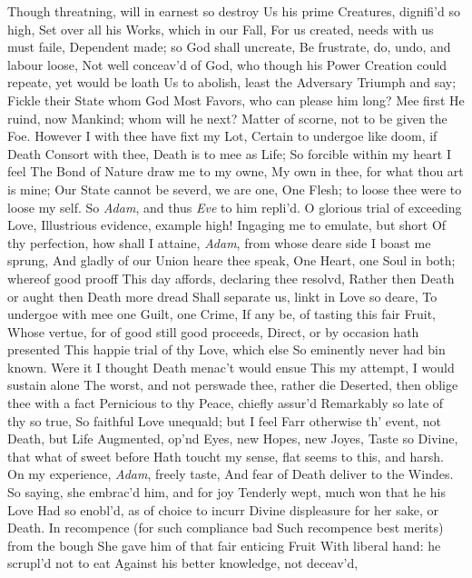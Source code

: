 \documentclass[11pt]{book}
\newcounter {first}
\begin{document}
Though threatning, will in earnest so destroy 
Us his prime Creatures, dignifi'd so high, 
Set over all his Works, which in our Fall, 
For us created, needs with us must faile, 
Dependent made; so God shall uncreate, 
Be frustrate, do, undo, and labour loose, 
Not well conceav'd of God, who though his Power 
Creation could repeate, yet would be loath 
Us to abolish, least the Adversary 
Triumph and say; Fickle their State whom God 
Most Favors, who can please him long?  Mee first 
He ruind, now Mankind; whom will he next? 
Matter of scorne, not to be given the Foe. 
However I with thee have fixt my Lot, 
Certain to undergoe like doom, if Death 
Consort with thee, Death is to mee as Life; 
So forcible within my heart I feel 
The Bond of Nature draw me to my owne, 
My own in thee, for what thou art is mine; 
Our State cannot be severd, we are one, 
One Flesh; to loose thee were to loose my self. 
\quad So \textit{Adam}, and thus \textit{Eve} to him repli'd. 
O glorious trial of exceeding Love, 
Illustrious evidence, example high! 
Ingaging me to emulate, but short 
Of thy perfection, how shall I attaine, 
\textit{Adam}, from whose deare side I boast me sprung, 
And gladly of our Union heare thee speak, 
One Heart, one Soul in both; whereof good prooff 
This day affords, declaring thee resolvd, 
Rather then Death or aught then Death more dread 
Shall separate us, linkt in Love so deare, 
To undergoe with mee one Guilt, one Crime, 
If any be, of tasting this fair Fruit, 
Whose vertue, for of good still good proceeds, 
Direct, or by occasion hath presented 
This happie trial of thy Love, which else 
So eminently never had bin known. 
Were it I thought Death menac't would ensue 
This my attempt, I would sustain alone 
The worst, and not perswade thee, rather die 
Deserted, then oblige thee with a fact 
Pernicious to thy Peace, chiefly assur'd 
Remarkably so late of thy so true, 
So faithful Love unequald; but I feel 
Farr otherwise th' event, not Death, but Life 
Augmented, op'nd Eyes, new Hopes, new Joyes, 
Taste so Divine, that what of sweet before 
Hath toucht my sense, flat seems to this, and harsh. 
On my experience, \textit{Adam}, freely taste, 
And fear of Death deliver to the Windes. 
\quad So saying, she embrac'd him, and for joy 
Tenderly wept, much won that he his Love 
Had so enobl'd, as of choice to incurr 
Divine displeasure for her sake, or Death. 
In recompence (for such compliance bad 
Such recompence best merits) from the bough 
She gave him of that fair enticing Fruit 
With liberal hand: he scrupl'd not to eat 
Against his better knowledge, not deceav'd, 
\end{document}
